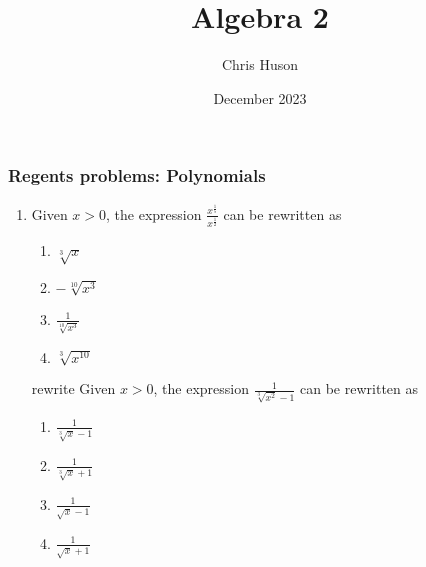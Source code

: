 \documentclass[12pt, twoside]{article}
\title{Algebra 2}
\author{Chris Huson}
\date{December 2023}
\begin{document}
\subsubsection*{Regents problems: Polynomials}
\begin{enumerate}[itemsep=0.5cm]
\item Given $x > 0$, the expression $\displaystyle \frac{x^{\frac{1}{5}}}{x^{\frac{1}{2}}}$ can be rewritten as
\begin{enumerate}
    \item $\sqrt[3]{x}$
    \item $-\sqrt[10]{x^3}$
    \item $\displaystyle \frac{1}{\sqrt[10]{x^3}}$
    \item $\sqrt[3]{x^{10}}$
\end{enumerate}

\item [rewrite] Given $x > 0$, the expression $\frac{1}{\sqrt[3]{x^2} - 1}$ can be rewritten as
\begin{enumerate}
    \item $\frac{1}{\sqrt[3]{x} - 1}$
    \item $\frac{1}{\sqrt[3]{x} + 1}$
    \item $\frac{1}{\sqrt{x} - 1}$
    \item $\frac{1}{\sqrt{x} + 1}$
\end{enumerate}


\end{enumerate}
\end{document}
